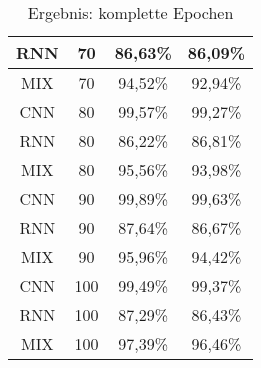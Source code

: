 \begin{table}[H]
\begin{tabular}{|c|c|c|c|}
                \hline
                RNN & 70 &  86,63\% & 86,09\%  \\ 
                \hline
                MIX & 70 &  94,52\% & 92,94\%  \\ 
                \hline
                \hline
                CNN & 80 &  99,57\% & 99,27\%  \\ 
                \hline
                RNN & 80 &  86,22\% & 86,81\%  \\ 
                \hline
                MIX & 80 &  95,56\% & 93,98\%  \\ 
                \hline
                \hline
                CNN & 90 &  99,89\% & 99,63\%  \\ 
                \hline
                RNN & 90 &  87,64\% & 86,67\%  \\ 
                \hline
                MIX & 90 &  95,96\% & 94,42\%  \\ 
                \hline
                \hline
                CNN & 100 & 99,49\% & 99,37\%  \\ 
                \hline
                RNN & 100 & 87,29\% & 86,43\%  \\ 
                \hline
                MIX & 100 & 97,39\% & 96,46\% \\
                \hline

            \end{tabular}
            \caption[Ergebnis: komplette Epochen]{Ergebnis: komplette Epochen}
            \label{tabl:ErgebnisEpochComplete}
        \end{table}
